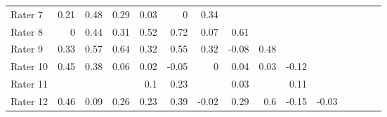 \begin{tabular}{l|rrrrrrrrrrrrrl}
Rater 7 & \cellcolor[rgb]{ .953,  .965,  .988}0.21 & \cellcolor[rgb]{ .71,  .792,  .902}0.48 & \cellcolor[rgb]{ .882,  .914,  .965}0.29 & \cellcolor[rgb]{ .984,  .859,  .871}0.03 & \cellcolor[rgb]{ .98,  .831,  .843}0 & \cellcolor[rgb]{ .835,  .882,  .949}0.34 & \multicolumn{1}{l}{} & \multicolumn{1}{l}{} & \multicolumn{1}{l}{} & \multicolumn{1}{l}{} & \multicolumn{1}{l}{} & \multicolumn{1}{l}{} & \multicolumn{1}{l}{} &  \\
Rater 8 & \cellcolor[rgb]{ .98,  .831,  .843}0 & \cellcolor[rgb]{ .745,  .82,  .918}0.44 & \cellcolor[rgb]{ .863,  .902,  .957}0.31 & \cellcolor[rgb]{ .671,  .765,  .89}0.52 & \cellcolor[rgb]{ .49,  .639,  .827}0.72 & \cellcolor[rgb]{ .984,  .898,  .906}0.07 & \cellcolor[rgb]{ .592,  .71,  .863}0.61 & \multicolumn{1}{l}{} & \multicolumn{1}{l}{} & \multicolumn{1}{l}{} & \multicolumn{1}{l}{} & \multicolumn{1}{l}{} & \multicolumn{1}{l}{} &  \\
Rater 9 & \cellcolor[rgb]{ .843,  .886,  .949}0.33 & \cellcolor[rgb]{ .627,  .733,  .875}0.57 & \cellcolor[rgb]{ .565,  .69,  .851}0.64 & \cellcolor[rgb]{ .855,  .894,  .953}0.32 & \cellcolor[rgb]{ .647,  .749,  .882}0.55 & \cellcolor[rgb]{ .855,  .894,  .953}0.32 & \cellcolor[rgb]{ .98,  .761,  .773}-0.08 & \cellcolor[rgb]{ .71,  .792,  .902}0.48 & \multicolumn{1}{l}{} & \multicolumn{1}{l}{} & \multicolumn{1}{l}{} & \multicolumn{1}{l}{} & \multicolumn{1}{l}{} &  \\
Rater 10 & \cellcolor[rgb]{ .737,  .812,  .914}0.45 & \cellcolor[rgb]{ .8,  .855,  .933}0.38 & \cellcolor[rgb]{ .984,  .886,  .898}0.06 & \cellcolor[rgb]{ .984,  .851,  .863}0.02 & \cellcolor[rgb]{ .98,  .788,  .8}-0.05 & \cellcolor[rgb]{ .98,  .831,  .843}0 & \cellcolor[rgb]{ .984,  .871,  .878}0.04 & \cellcolor[rgb]{ .984,  .859,  .871}0.03 & \cellcolor[rgb]{ .98,  .725,  .733}-0.12 & \multicolumn{1}{l}{} & \multicolumn{1}{l}{} & \multicolumn{1}{l}{} & \multicolumn{1}{l}{} &  \\
Rater 11 & \multicolumn{1}{l}{} & \multicolumn{1}{l}{} & \multicolumn{1}{l}{} & \cellcolor[rgb]{ .984,  .922,  .933}0.1 & \cellcolor[rgb]{ .937,  .953,  .984}0.23 & \multicolumn{1}{l}{} & \cellcolor[rgb]{ .984,  .859,  .871}0.03 & \multicolumn{1}{l}{} & \cellcolor[rgb]{ .984,  .933,  .945}0.11 & \multicolumn{1}{l}{} & \multicolumn{1}{l}{} & \multicolumn{1}{l}{} & \multicolumn{1}{l}{} &  \\
Rater 12 & \cellcolor[rgb]{ .725,  .804,  .91}0.46 & \cellcolor[rgb]{ .984,  .914,  .925}0.09 & \cellcolor[rgb]{ .91,  .933,  .973}0.26 & \cellcolor[rgb]{ .937,  .953,  .984}0.23 & \cellcolor[rgb]{ .792,  .851,  .933}0.39 & \cellcolor[rgb]{ .98,  .816,  .827}-0.02 & \cellcolor[rgb]{ .882,  .914,  .965}0.29 & \cellcolor[rgb]{ .6,  .714,  .863}0.6 & \cellcolor[rgb]{ .98,  .698,  .71}-0.15 & \cellcolor[rgb]{ .98,  .808,  .816}-0.03 & \multicolumn{1}{l}{} & \multicolumn{1}{l}{} & \multicolumn{1}{l}{} &  \\

\end{tabular}
